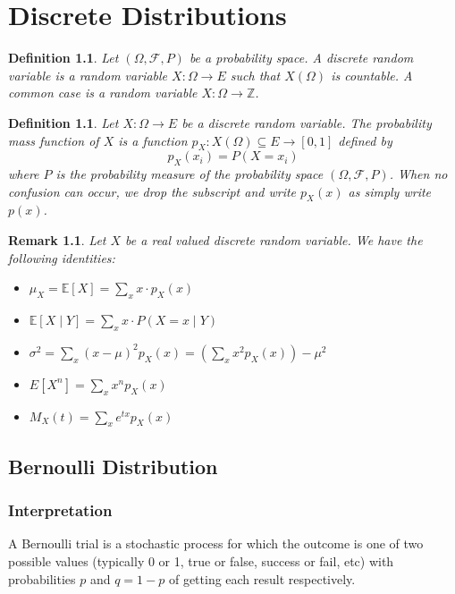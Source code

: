 \documentclass[1pt]{report}
\newtheorem{defn}[thm]{Definition}
\newtheorem{rmk}[thm]{Remark}
\newcommand{\Z}{\mathbb{Z}}
\newcommand{\<}{\langle}
\renewcommand{\>}{\rangle}
\newcommand{\FF}{\mathcal{F}}
\newcommand{\E}{\mathbb{E}}
\begin{document}
\chapter{Discrete Distributions}
\begin{defn}\label{def:discreterandomvariable}
Let $(\Omega, \FF, P)$ be a probability space. A \emph{discrete random variable}  is a random variable $X : \Omega \to E$ such that $X(\Omega)$ is countable. A common case is a random variable $X: \Omega \to \Z$. 
\end{defn}
\begin{defn}\label{def:pmf}
Let $X: \Omega \to E$ be a discrete random variable. The \emph{probability mass function}  of $X$ is a function $p_X: X(\Omega) \subseteq E \to [0,1]$ defined by
$$p_X(x_i) = P(X = x_i)$$
where $P$ is the probability measure of the probability space $(\Omega, \FF, P)$. When no confusion can occur, we drop the subscript and write $p_X(x)$ as simply write $p(x)$.
\end{defn}
\begin{rmk}\label{rmk:discreteidentities}
Let $X$ be a real valued discrete random variable. We have the following identities:
\begin{itemize}
\item $\mu_X = \E[X] = \sum\limits_{x} x\cdot p_X(x)$
\item $\E[X\mid Y] = \sum\limits_x x \cdot P(X=x \mid Y)$
\item $\sigma^2 = \sum\limits_x (x-\mu)^2 p_X(x) = \left(\sum\limits_x x^2 p_X(x)\right) - \mu^2$
\item $E[X^n] = \sum\limits_x x^n p_X(x)$
\item $M_X(t) = \sum\limits_x e^{tx} p_X(x)$
\end{itemize}
\end{rmk}
\newpage
\section{Bernoulli Distribution}
\subsection{Interpretation} 
A Bernoulli trial is a stochastic process for which the outcome is one of two possible values (typically 0 or 1, true or false, success or fail, etc) with probabilities $p$ and $q=1-p$ of getting each result respectively.
\end{document}
